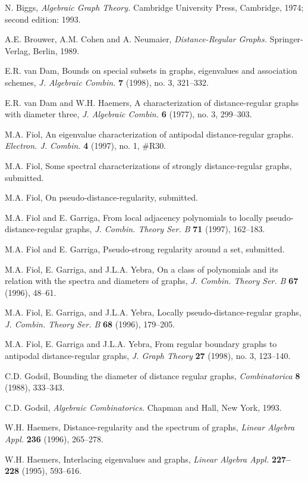 \documentclass[11pt]{article}
\begin{document}
\begin{thebibliography}{99}

N. Biggs, {\it Algebraic Graph Theory.}  Cambridge
University Press,  Cambridge, 1974; second edition: 1993.
 
A.E. Brouwer, A.M. Cohen and A. Neumaier, {\it Distance-Regular
Graphs.}  Springer-Verlag, Berlin, 1989.

E.R. van Dam,  Bounds on special subsets in graphs, eigenvalues and 
association schemes, {\it J. Algebraic Combin.} {\bf 7} (1998),  no. 3, 
321--332.

E.R. van Dam and W.H. Haemers, A characterization
of distance-regular  graphs with diameter three,  {\it J. Algebraic
Combin.} {\bf 6} (1977), no. 3, 299--303.

M.A. Fiol, An eigenvalue characterization of antipodal
distance-regular graphs.   {\it Electron. J. Combin.} {\bf 4} (1997), 
no. 1, \#R30.

M.A. Fiol, Some spectral characterizations of strongly
distance-regular graphs, submitted.

M.A. Fiol, 
On pseudo-distance-regularity, submitted.

M.A. Fiol and E. Garriga, From local adjacency 
polynomials to locally pseudo-distance-regular graphs, 
{\it J.  Combin. Theory Ser. B} {\bf 71} (1997), 162--183.

M.A. Fiol and E. Garriga,
Pseudo-strong regularity around a set, submitted. 

M.A. Fiol,  E. Garriga, and J.L.A. Yebra,  On a class of polynomials and
its relation with the  spectra and diameters of graphs,  {\it J. 
Combin. Theory Ser. B} {\bf 67} (1996), 48--61.

M.A. Fiol,  E. Garriga, and J.L.A. Yebra, Locally
pseudo-distance-regular graphs,    {\it J.  Combin. Theory Ser. B} 
{\bf 68} (1996), 179--205.

M.A. Fiol, E. Garriga and J.L.A. Yebra, From regular
boundary graphs to antipodal distance-regular graphs, 
{\it J. Graph Theory} {\bf 27} (1998), no. 3, 123--140. 

C.D. Godsil, Bounding the diameter of distance regular graphs, 
{\it Combinatorica} {\bf 8} (1988),  333--343.

C.D. Godsil, {\it Algebraic Combinatorics.}  Chapman and Hall, 
New York, 1993.

W.H. Haemers, Distance-regularity and the spectrum
of graphs, {\it Linear Algebra Appl.} {\bf 236} (1996), 265--278.

W.H. Haemers, Interlacing eigenvalues and graphs, 
{\it Linear Algebra  Appl.} {\bf 227--228} (1995), 593--616.  

\end{thebibliography} 
  
\end{document}
